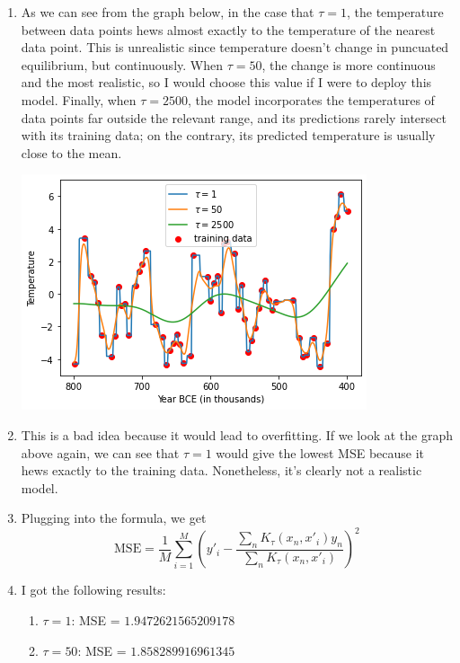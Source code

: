 \documentclass[submit]{harvardml}
\begin{document}
\newpage
\begin{enumerate}
    \item As we can see from the graph below, in the case that $\tau = 1$, the temperature between data points hews almost exactly to the temperature of the nearest data point. This is unrealistic since temperature doesn't change in puncuated equilibrium, but continuously. When $\tau = 50$, the change is more continuous and the most realistic, so I would choose this value if I were to deploy this model. Finally, when $\tau = 2500$, the model incorporates the temperatures of data points far outside the relevant range, and its predictions rarely intersect with its training data; on the contrary, its predicted temperature is usually close to the mean.  
    \begin{center}
    \includegraphics[scale=0.7]{hw1/plotto.png}
    \end{center}
    \newline
    \item This is a bad idea because it would lead to overfitting. If we look at the graph above again, we can see that $\tau = 1$ would give the lowest MSE because it hews exactly to the training data. Nonetheless, it's clearly not a realistic model.
    \item Plugging into the formula, we get 
    $$
    \text{MSE} = \frac{1}{M}\sum_{i = 1}^M\left(y'_i - \frac{\sum_{n}K_\tau(x_n, x'_i)y_n}{\sum_n K_\tau(x_n, x'_i)}\right)^2$$
    \item I got the following results:
    \begin{enumerate}
        \item $\tau = 1$: MSE = $1.9472621565209178$
        \item $\tau = 50$: MSE = $1.858289916961345$

\end{enumerate}
\end{enumerate}
\end{document}
